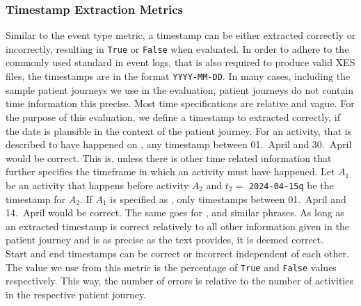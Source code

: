 \subsubsection{Timestamp Extraction Metrics}\label{sec:time_metrics}
Similar to the event type metric, a timestamp can be either extracted correctly or incorrectly, resulting in \verb|True| or \verb|False| when evaluated. In order to adhere to the commonly used standard in event logs, that is also required to produce valid XES files, the timestamps are in the format \verb|YYYY-MM-DD|. In many cases, including the sample patient journeys we use in the evaluation, patient journeys do not contain time information this precise. Most time specifications are relative and vague. For the purpose of this evaluation, we define a timestamp to extracted correctly, if the date is plausible in the context of the patient journey. For an activity, that is described to have happened on , any timestamp between 01.~April and 30.~April would be correct. This is, unless there is other time related information that further specifies the timeframe in which an activity must have happened. Let $A_1$ be an activity that happens before activity $A_2$ and $t_2=$ \verb|2024-04-15q| be the timestamp for $A_2$. If $A_1$ is specified as , only timestamps between 01.~April and 14.~April would be correct. The same goes for ,  and similar phrases. As long as an extracted timestamp is correct relatively to all other information given in the patient journey and is as precise as the text provides, it is deemed correct.\\
Start and end timestamps can be correct or incorrect independent of each other. The value we use from this metric is the percentage of \verb|True| and \verb|False| values respectively. This way, the number of errors is relative to the number of activities in the respective patient journey.


